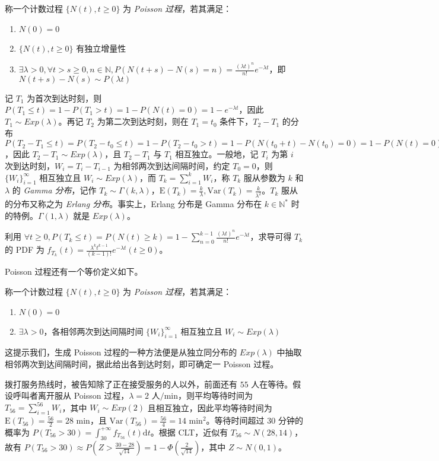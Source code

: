 \documentclass[../main.tex]{subfiles}
\begin{document}
\begin{definition}\label{def:6.3.3}
    称一个计数过程 $\{N(t),t\geq0\}$ 为 \emph{Poisson 过程}，若其满足：
    \begin{enumerate}
        \item $N(0)=0$
        \item $\{N(t),t\geq0\}$ 有独立增量性
        \item $\exists\lambda>0,\forall t>s\geq0,n\in\mathbb N,P(N(t+s)-N(s)=n)=\frac{(\lambda t)^n}{n!}e^{-\lambda t}$，即 $N(t+s)-N(s)\sim P(\lambda t)$
    \end{enumerate}
\end{definition}

记 $T_1$ 为首次到达时刻，则 $P(T_1\leq t)=1-P(T_1>t)=1-P(N(t)=0)=1-e^{-\lambda t}$，因此 $T_1\sim Exp(\lambda)$。再记 $T_2$ 为第二次到达时刻，则在 $T_1=t_0$ 条件下，$T_2-T_1$ 的分布 $P(T_2-T_1\leq t)=P(T_2-t_0\leq t)=1-P(T_2-t_0>t)=1-P(N(t_0+t)-N(t_0)=0)=1-P(N(t)=0)=1-e^{-\lambda t}$，因此 $T_2-T_1\sim Exp(\lambda)$，且 $T_2-T_1$ 与 $T_1$ 相互独立。一般地，记 $T_i$ 为第 $i$ 次到达时刻，$W_i=T_i-T_{i-1}$ 为相邻两次到达间隔时间，约定 $T_0=0$，则 $\{W_i\}_{i=1}^\infty$ 相互独立且 $W_i\sim Exp(\lambda)$，而 $T_k=\sum_{i=1}^kW_i$，称 $T_k$ 服从参数为 $k$ 和 $\lambda$ 的 \emph{Gamma 分布}，记作 $T_k\sim \Gamma(k,\lambda)$，$\mathrm E(T_k)=\frac k\lambda,\mathrm{Var}(T_k)=\frac k{\lambda^2}$。$T_k$ 服从的分布又称之为 \emph{Erlang 分布}。事实上，Erlang 分布是 Gamma 分布在 $k\in\mathbb N^*$ 时的特例。$\Gamma(1,\lambda)$ 就是 $Exp(\lambda)$。

利用 $\forall t\geq0,P(T_k\leq t)=P(N(t)\geq k)=1-\sum_{n=0}^{k-1}\frac{(\lambda t)^n}{n!}e^{-\lambda t}$，求导可得 $T_k$ 的 PDF 为 $f_{T_k}(t)=\frac{\lambda^kt^{k-1}}{(k-1)!}e^{-\lambda t}(t\geq 0)$。

Poisson 过程还有一个等价定义如下。

\begin{definition}\label{def:6.3.4}
    称一个计数过程 $\{N(t),t\geq0\}$ 为 \emph{Poisson 过程}，若其满足：
    \begin{enumerate}
        \item $N(0)=0$
        \item $\exists\lambda>0$，各相邻两次到达间隔时间 $\{W_i\}_{i=1}^\infty$ 相互独立且 $W_i\sim Exp(\lambda)$
    \end{enumerate}
\end{definition}

这提示我们，生成 Poisson 过程的一种方法便是从独立同分布的 $Exp(\lambda)$ 中抽取相邻两次到达间隔时间，据此给出各到达时刻，即可确定一 Poisson 过程。

\begin{example}
    拨打服务热线时，被告知除了正在接受服务的人以外，前面还有 $55$ 人在等待。假设呼叫者离开服从 Poisson 过程，$\lambda=2\text{ 人/min}$，则平均等待时间为 $T_{56}=\sum_{i=1}^{56}W_i$，其中 $W_i\sim Exp(2)$ 且相互独立，因此平均等待时间为 $\mathrm E(T_{56})=\frac{56}{2}=28\text{ min}$，且 $\mathrm{Var}(T_{56})=\frac{56}{4}=14\text{ min}^2$。等待时间超过 $30$ 分钟的概率为 $P(T_{56}>30)=\int_{30}^{+\infty}f_{T_{56}}(t)\mathrm dt$。根据 CLT，近似有 $T_{56}\sim N(28,14)$，故有 $P(T_{56}>30)\approx P(Z>\frac{30-28}{\sqrt{14}})=1-\Phi(\frac2{\sqrt{14}})$，其中 $Z\sim N(0,1)$。
\end{example}
\end{document}
